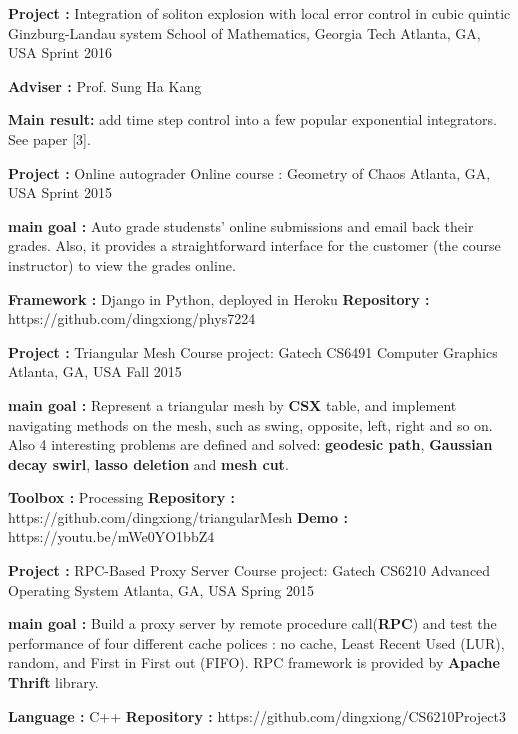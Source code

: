 \begin{cventries}

\cventry
{\textbf{Project :} Integration of soliton explosion with local error control in cubic quintic 
  Ginzburg-Landau system} 
{School of Mathematics, Georgia Tech} 
{Atlanta, GA, USA} %
{Sprint 2016} %
{
  \begin{cvitems}
  \item {\textbf{Adviser :} Prof. Sung Ha Kang}
  \item {\textbf{Main result:}  add time step control into a few popular exponential integrators. See paper [3].}
  \end{cvitems}
}


\cventry
{\textbf{Project :} Online autograder} 
{Online course : Geometry of Chaos} 
{Atlanta, GA, USA} %
{Sprint 2015} %
{
  \begin{cvitems}
  \item {\textbf{main goal :} Auto grade studensts' online submissions and email back their grades. Also, 
      it provides a straightforward interface for the customer (the course instructor)
      to view the grades online.}
  \item {\textbf{Framework :} Django in Python, deployed in Heroku \quad
      \textbf{Repository :} {\color{red} https://github.com/dingxiong/phys7224} 
    }
  \end{cvitems}
}

\cventry
{\textbf{Project :} Triangular Mesh} 
{Course project: Gatech CS6491 Computer Graphics} 
{Atlanta, GA, USA} %
{Fall 2015} %
{
  \begin{cvitems}
  \item {\textbf{main goal :} Represent a triangular mesh by \textbf{CSX} table, and implement navigating
      methods on the mesh, such as swing, opposite, left, right and so on. Also 4 interesting problems
      are defined and solved: \textbf{geodesic path}, 
      \textbf{Gaussian decay swirl}, \textbf{lasso deletion} and \textbf{mesh cut}.}
  \item {\textbf{Toolbox :} Processing \quad
      \textbf{Repository :} {\color{red} https://github.com/dingxiong/triangularMesh}
      \quad
      \textbf{Demo : }  {\color{red} https://youtu.be/mWe0YO1bbZ4}}
  \end{cvitems}
}

\cventry
{\textbf{Project :} RPC-Based Proxy Server} 
{Course project: Gatech CS6210 Advanced Operating System} 
{Atlanta, GA, USA} %
{Spring 2015} %
{
  \begin{cvitems}
  \item {\textbf{main goal :} Build a proxy server by remote procedure call(\textbf{RPC}) and test
      the performance of four different cache polices : no cache, Least Recent Used (LUR), random,
      and First in First out (FIFO). RPC framework is provided by \textbf{Apache Thrift} library.
    }
  \item {\textbf{Language :} C++  \quad
      \textbf{Repository :} {\color{red} https://github.com/dingxiong/CS6210Project3}
    }
  \end{cvitems}
}


\end{cventries}

